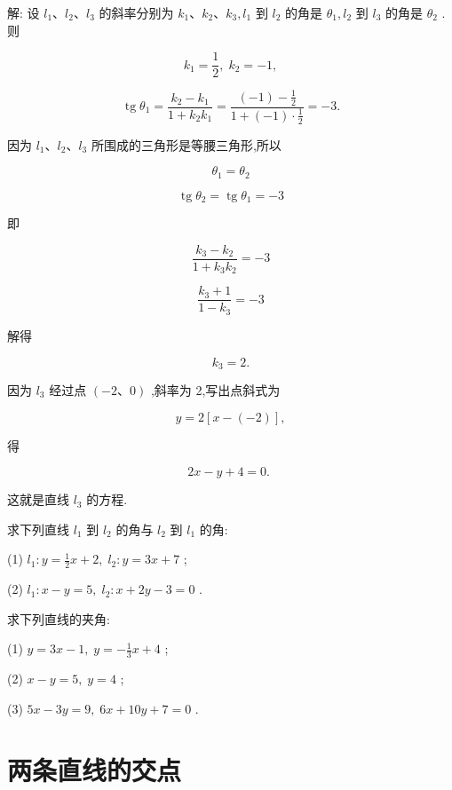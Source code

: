 \documentclass[lang=cn,newtx,10.5pt,scheme=chinese]{elegantbook}
\begin{document}
解: 设 \({l}_{1}\text{、}{l}_{2}\text{、}{l}_{3}\) 的斜率分别为 \({k}_{1}\text{、}{k}_{2}\text{、}{k}_{3},{l}_{1}\) 到 \({l}_{2}\) 的角是 \({\theta }_{1},{l}_{2}\) 到 \({l}_{3}\) 的角是 \({\theta }_{2}\) . 则

\[
    {k}_{1} = \frac{1}{2},\;{k}_{2} = - 1,
\]

\[
  \operatorname{tg}{\theta }_{1} = \frac{{k}_{2} - {k}_{1}}{1 + {k}_{2}{k}_{1}} = \frac{\left( {-1}\right) - \frac{1}{2}}{1 + \left( {-1}\right) \cdot \frac{1}{2}} = - 3.
\]

因为 \({l}_{1}\text{、}{l}_{2}\text{、}{l}_{3}\) 所围成的三角形是等腰三角形,所以

\[
    {\theta }_{1} = {\theta }_{2}
\]

\[
  \operatorname{tg}{\theta }_{2} = \operatorname{tg}{\theta }_{1} = - 3
\]

即

\[
  \frac{{k}_{3} - {k}_{2}}{1 + {k}_{3}{k}_{2}} = - 3
\]

\[
  \frac{{k}_{3} + 1}{1 - {k}_{3}} = - 3
\]

解得

\[
    {k}_{3} = 2\text{.}
\]

因为 \({l}_{3}\) 经过点 \(\left( {-2\text{、}0}\right)\) ,斜率为 2,写出点斜式为

\[
  y = 2\left\lbrack {x - \left( {-2}\right) }\right\rbrack ,
\]

得

\[
    {2x} - y + 4 = 0\text{. }
\]

这就是直线 \({l}_{3}\) 的方程.

\begin{problemset}[练习]

\item 求下列直线 \({l}_{1}\) 到 \({l}_{2}\) 的角与 \({l}_{2}\) 到 \({l}_{1}\) 的角:

(1) \({l}_{1} : y = \frac{1}{2}x + 2,\;{l}_{2} : y = {3x} + 7\) ;

(2) \({l}_{1} : x - y = 5,\;{l}_{2} : x + {2y} - 3 = 0\) .

\item 求下列直线的夹角:

(1) \(y = {3x} - 1,\;y = - \frac{1}{3}x + 4\) ;

(2) \(x - y = 5,\;y = 4\) ;

(3) \({5x} - {3y} = 9,\;{6x} + {10y} + 7 = 0\) .
\end{problemset}

\section{两条直线的交点}
\end{document}
